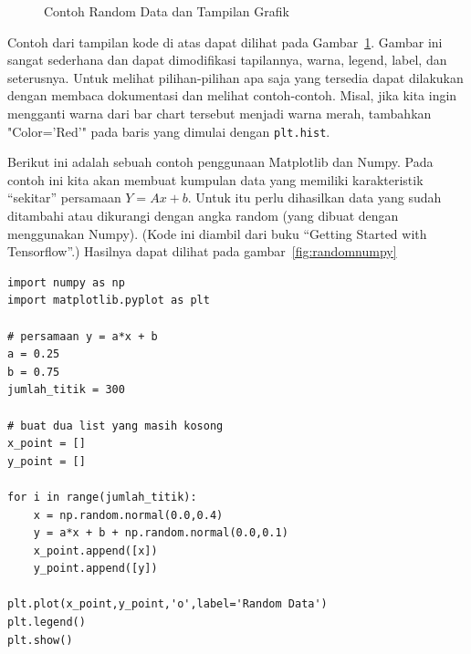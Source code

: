 \begin{figure}[ht]
\caption{Contoh Random Data dan Tampilan Grafik}
\label{fig:random-gausian}
\end{figure}

Contoh dari tampilan kode di atas dapat dilihat pada
Gambar~\ref{fig:random-gausian}.
Gambar ini sangat sederhana dan dapat dimodifikasi tapilannya,
warna, legend, label, dan seterusnya.
Untuk melihat pilihan-pilihan apa saja yang tersedia dapat dilakukan
dengan membaca dokumentasi dan melihat contoh-contoh.
Misal, jika kita ingin mengganti warna dari bar chart tersebut
menjadi warna merah, tambahkan "Color='Red'" pada baris yang 
dimulai dengan {\tt plt.hist}.


Berikut ini adalah sebuah contoh penggunaan Matplotlib dan Numpy. Pada contoh ini kita akan membuat kumpulan data yang memiliki karakteristik ``sekitar'' persamaan 
$Y = Ax + b$.
Untuk itu perlu dihasilkan data yang sudah ditambahi atau dikurangi dengan angka random (yang dibuat dengan menggunakan Numpy). (Kode ini diambil dari buku ``Getting Started with Tensorflow''\cite{tensorflowstarted}.)
Hasilnya dapat dilihat pada gambar~\ref{fig:randomnumpy}


\begin{verbatim}
import numpy as np
import matplotlib.pyplot as plt

# persamaan y = a*x + b
a = 0.25
b = 0.75
jumlah_titik = 300

# buat dua list yang masih kosong
x_point = []
y_point = []

for i in range(jumlah_titik):
    x = np.random.normal(0.0,0.4)
    y = a*x + b + np.random.normal(0.0,0.1)
    x_point.append([x])
    y_point.append([y])

plt.plot(x_point,y_point,'o',label='Random Data')
plt.legend()
plt.show()
\end{verbatim}


